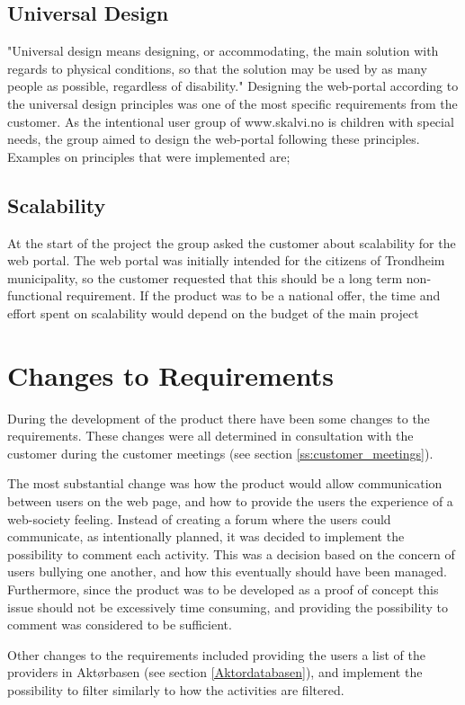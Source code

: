 \subsection{Universal Design}
\label{universalDesign}
"Universal design means designing, or accommodating, the main solution with regards to physical conditions, so that the solution may be used by as many people as possible, regardless of disability." \cite{Difi} Designing the web-portal according to the universal design principles was one of the most specific requirements from the customer. As the intentional user group of www.skalvi.no is children with special needs, the group aimed to design the web-portal following these principles. Examples on principles that were implemented are;   


\subsection{Scalability}
At the start of the project the group asked the customer about scalability for the web portal. The web portal was initially intended for the citizens of Trondheim municipality, so the customer requested that this should be a long term non-functional requirement. If the product was to be a national offer, the time and effort spent on scalability would depend on the budget of the main project


\section{Changes to Requirements}
During the development of the product there have been some changes to the requirements. These changes were all determined in consultation with the customer during the customer meetings (see section \ref{ss:customer_meetings}). 

The most substantial change was how the product would allow communication between users on the web page, and how to provide the users the experience of a web-society feeling. Instead of creating a forum where the users could communicate, as intentionally planned, it was decided to implement the possibility to comment each activity. This was a decision based on the concern of users bullying one another, and how this eventually should have been managed. Furthermore, since the product was to be developed as a proof of concept this issue should not be excessively time consuming, and providing the possibility to comment was considered to be sufficient. 

Other changes to the requirements included providing the users a list of the providers in Aktørbasen (see section \ref{Aktordatabasen}), and implement the possibility to filter similarly to how the activities are filtered.  

